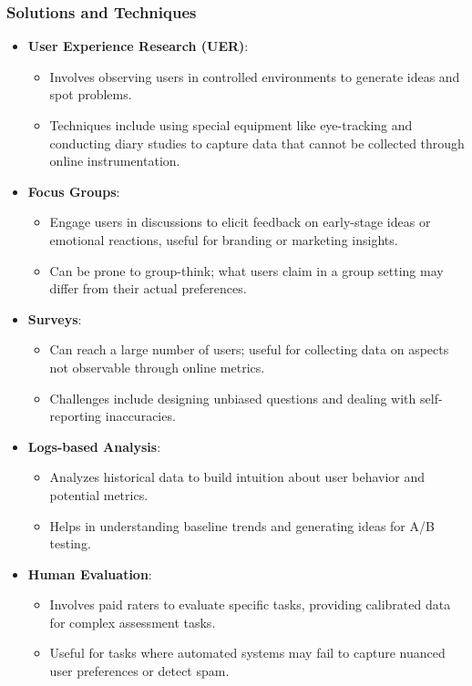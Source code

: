 \documentclass{article}
\begin{document}
\subsubsection*{Solutions and Techniques}
\begin{itemize}
    \item \textbf{User Experience Research (UER)}:
    \begin{itemize}
        \item Involves observing users in controlled environments to generate ideas and spot problems.
        \item Techniques include using special equipment like eye-tracking and conducting diary studies to capture data that cannot be collected through online instrumentation.
    \end{itemize}

    \item \textbf{Focus Groups}:
    \begin{itemize}
        \item Engage users in discussions to elicit feedback on early-stage ideas or emotional reactions, useful for branding or marketing insights.
        \item Can be prone to group-think; what users claim in a group setting may differ from their actual preferences.
    \end{itemize}

    \item \textbf{Surveys}:
    \begin{itemize}
        \item Can reach a large number of users; useful for collecting data on aspects not observable through online metrics.
        \item Challenges include designing unbiased questions and dealing with self-reporting inaccuracies.
    \end{itemize}

    \item \textbf{Logs-based Analysis}:
    \begin{itemize}
        \item Analyzes historical data to build intuition about user behavior and potential metrics.
        \item Helps in understanding baseline trends and generating ideas for A/B testing.
    \end{itemize}

    \item \textbf{Human Evaluation}:
    \begin{itemize}
        \item Involves paid raters to evaluate specific tasks, providing calibrated data for complex assessment tasks.
        \item Useful for tasks where automated systems may fail to capture nuanced user preferences or detect spam.
    \end{itemize}


\end{itemize}
\end{document}
